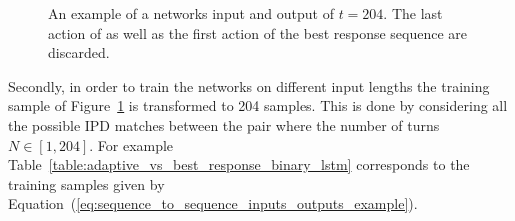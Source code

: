 \begin{figure}[!htbp]
    \centering
    
    \caption{An example of a networks input and output of \(t=204\). The last
    action of \Adaptive as well as the first action of the best
    response sequence are discarded.}\label{fig:input_output_example}
\end{figure}

Secondly, in order to train the networks on different input lengths the training
sample of Figure~\ref{fig:input_output_example} is transformed to 204 samples.
This is done by considering all the possible IPD matches between
the pair where the number of turns \(N \in [1, 204]\). For example
Table~\ref{table:adaptive_vs_best_response_binary_lstm} corresponds to the
training samples given by Equation~(\ref{eq:sequence_to_sequence_inputs_outputs_example}).

